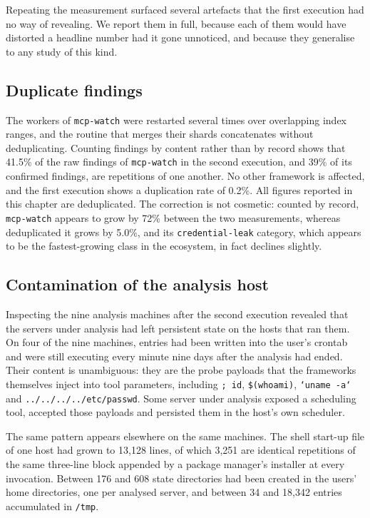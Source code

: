 Repeating the measurement surfaced several artefacts that the first execution had
no way of revealing. We report them in full, because each of them would have
distorted a headline number had it gone unnoticed, and because they generalise to
any study of this kind.

\subsection{Duplicate findings}
\label{sec:long:duplicates}

The workers of \texttt{mcp-watch} were restarted several times over overlapping
index ranges, and the routine that merges their shards concatenates without
deduplicating. Counting findings by content rather than by record shows that
41.5\% of the raw findings of \texttt{mcp-watch} in the second execution, and 39\%
of its confirmed findings, are repetitions of one another. No other framework is
affected, and the first execution shows a duplication rate of 0.2\%. All figures
reported in this chapter are deduplicated. The correction is not cosmetic: counted
by record, \texttt{mcp-watch} appears to grow by 72\% between the two
measurements, whereas deduplicated it grows by 5.0\%, and its
\texttt{credential-leak} category, which appears to be the fastest-growing class
in the ecosystem, in fact declines slightly.

\subsection{Contamination of the analysis host}
\label{sec:long:contamination}

Inspecting the nine analysis machines after the second execution revealed that the
servers under analysis had left persistent state on the hosts that ran them. On
four of the nine machines, entries had been written into the user's crontab and
were still executing every minute nine days after the analysis had ended. Their
content is unambiguous: they are the probe payloads that the frameworks themselves
inject into tool parameters, including \texttt{; id}, \texttt{\$(whoami)},
\texttt{`uname -a`} and \texttt{../../../../etc/passwd}. Some server under
analysis exposed a scheduling tool, accepted those payloads and persisted them in
the host's own scheduler.

The same pattern appears elsewhere on the same machines. The shell start-up file
of one host had grown to 13,128 lines, of which 3,251 are identical repetitions of
the same three-line block appended by a package manager's installer at every
invocation. Between 176 and 608 state directories had been created in the users'
home directories, one per analysed server, and between 34 and 18,342 entries
accumulated in \texttt{/tmp}.

